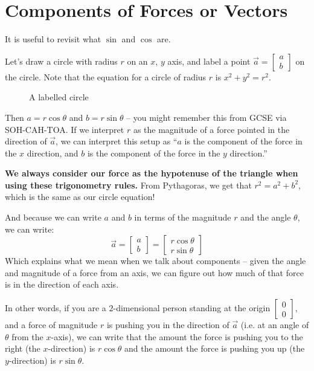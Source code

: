 \section{Components of Forces or Vectors} \label{sec:components-of-forces-or-vectors}

It is useful to revisit what $\sin$ and $\cos$ are.

Let's draw a circle with radius $r$ on an $x$, $y$ axis, and label a point $\vec{a} = \begin{bmatrix} a \\ b \end{bmatrix}$ on the circle. 
Note that the equation for a circle of radius $r$ is $x^2 + y^2 = r^2$.

\begin{figure}[H]
    \centering
    \caption{A labelled circle}
    \label{fig:circle}
\end{figure}

Then $a = r \cos \theta$ and $b = r \sin \theta$ -- you might remember this from GCSE via SOH-CAH-TOA. 
If we interpret $r$ as the magnitude of a force pointed in the direction of $\vec{a}$, we can interpret this setup as ``$a$ is the component of the force in the $x$ direction, and $b$ is the component of the force in the $y$ direction.''

\textbf{We always consider our force as the hypotenuse of the triangle when using these trigonometry rules.} From Pythagoras, we get that $r^2 = a^2 + b^2$, which is the same as our circle equation!

And because we can write $a$ and $b$ in terms of the magnitude $r$ and the angle $\theta$, we can write:
\[ 
\vec{a} = \begin{bmatrix} a \\ b \end{bmatrix} = \begin{bmatrix}
    r \cos \theta \\ 
    r \sin \theta
\end{bmatrix}
\]
Which explains what we mean when we talk about components -- given the angle and magnitude of a force from an axis, we can figure out how much of that force is in the direction of each axis.

In other words, if you are a $2$-dimensional person standing at the origin $\begin{bmatrix} 0 \\ 0 \end{bmatrix}$, 
and a force of magnitude $r$ is pushing you in the direction of $\vec{a}$ (i.e. at an angle of $\theta$ from the $x$-axis), 
we can write that the amount the force is pushing you to the right (the $x$-direction) is $r \cos \theta$ and the amount the force is pushing you up (the $y$-direction) is $r \sin \theta$.


